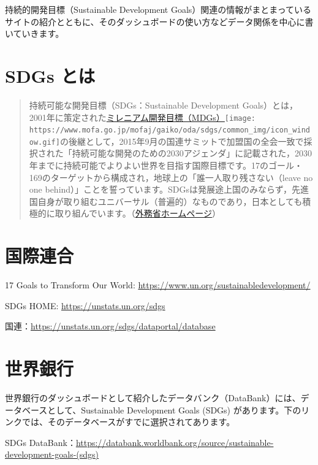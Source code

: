 \documentclass[
  xelatex, ja=standard]{bxjsbook}
\theoremstyle{definition}
\theoremstyle{definition}
\theoremstyle{definition}
\theoremstyle{definition}
\theoremstyle{remark}
\begin{document}
持続的開発目標（Sustainable Development Goals）関連の情報がまとまっているサイトの紹介とともに、そのダッシュボードの使い方などデータ関係を中心に書いていきます。

\hypertarget{sdgs-ux3068ux306f}{%
\section{SDGs とは}\label{sdgs-ux3068ux306f}}

\begin{quote}
持続可能な開発目標（SDGs：Sustainable Development Goals）とは，2001年に策定された\href{https://www.mofa.go.jp/mofaj/gaiko/oda/doukou/mdgs.html}{ミレニアム開発目標（MDGs）}\texttt{[image: https://www.mofa.go.jp/mofaj/gaiko/oda/sdgs/common\_img/icon\_window.gif]}の後継として，2015年9月の国連サミットで加盟国の全会一致で採択された「持続可能な開発のための2030アジェンダ」に記載された，2030年までに持続可能でよりよい世界を目指す国際目標です。17のゴール・169のターゲットから構成され，地球上の「誰一人取り残さない（leave no one behind）」ことを誓っています。SDGsは発展途上国のみならず，先進国自身が取り組むユニバーサル（普遍的）なものであり，日本としても積極的に取り組んでいます。（\href{https://www.mofa.go.jp/mofaj/gaiko/oda/sdgs/about/index.html}{外務省ホームページ}）
\end{quote}

\hypertarget{ux56fdux969bux9023ux5408}{%
\section{国際連合}\label{ux56fdux969bux9023ux5408}}

17 Goals to Transform Our World: \url{https://www.un.org/sustainabledevelopment/}

SDGs HOME: \url{https://unstats.un.org/sdgs}

国連：\url{https://unstats.un.org/sdgs/dataportal/database}

\hypertarget{ux4e16ux754cux9280ux884c}{%
\section{世界銀行}\label{ux4e16ux754cux9280ux884c}}

世界銀行のダッシュボードとして紹介したデータバンク（DataBank）には、データベースとして、Sustainable Development Goals (SDGs) があります。下のリンクでは、そのデータベースがすでに選択されてあります。

SDGs DataBank：\url{https://databank.worldbank.org/source/sustainable-development-goals-(sdgs)}
\end{document}
